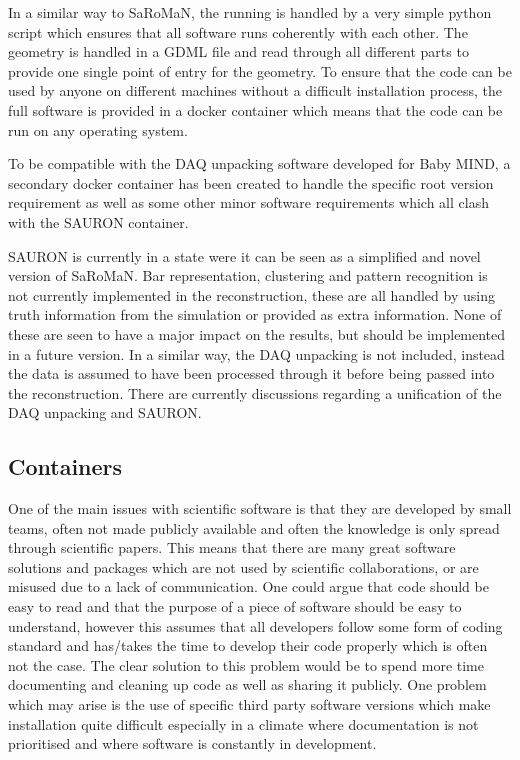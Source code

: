 In a similar way to SaRoMaN, the running is handled by a very simple python script which ensures that all software runs coherently with each other. The geometry is handled in a GDML file and read through all different parts to provide one single point of entry for the geometry. To ensure that the code can be used by anyone on different machines without a difficult installation process, the full software is provided in a docker container which means that the code can be run on any operating system. 

To be compatible with the DAQ unpacking software developed for Baby MIND, a secondary docker container has been created to handle the specific root version requirement as well as some other minor software requirements which all clash with the SAURON container.

SAURON is currently in a state were it can be seen as a simplified and novel version of SaRoMaN. Bar representation, clustering and pattern recognition is not currently implemented in the reconstruction, these are all handled by using truth information from the simulation or provided as extra information. None of these are seen to have a major impact on the results, but should be implemented in a future version. In a similar way, the DAQ unpacking is not included, instead the data is assumed to have been processed through it before being passed into the reconstruction. There are currently discussions regarding a unification of the DAQ unpacking and SAURON.

\subsection{Containers}
One of the main issues with scientific software is that they are developed by small teams, often not made publicly available and often the knowledge is only spread through scientific papers. This means that there are many great software solutions and packages which are not used by scientific collaborations, or are misused due to a lack of communication. One could argue that code should be easy to read and that the purpose of a piece of software should be easy to understand, however this assumes that all developers follow some form of coding standard and has/takes the time to develop their code properly which is often not the case. The clear solution to this problem would be to spend more time documenting and cleaning up code as well as sharing it publicly. One problem which may arise is the use of specific third party software versions which make installation quite difficult especially in a climate where documentation is not prioritised and where software is constantly in development.

